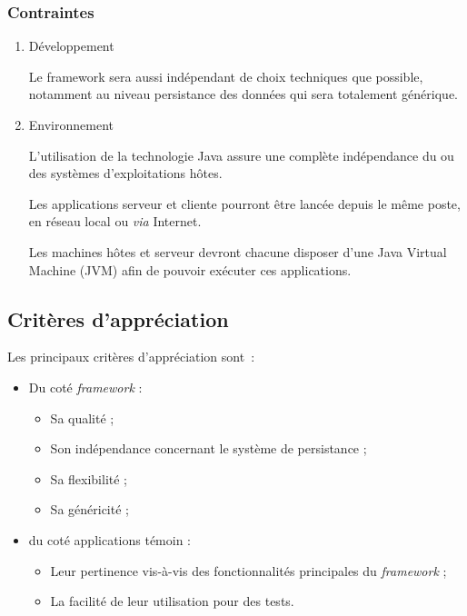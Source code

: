 \subsubsection{Contraintes}
\begin{enumerate}

	\item Développement

Le framework sera aussi indépendant de choix techniques que possible, notamment au niveau persistance des données qui sera totalement générique.

	\item Environnement

L'utilisation de la technologie Java assure une complète indépendance du ou des systèmes d'exploitations hôtes.

Les applications serveur et cliente pourront être lancée depuis le même poste, en réseau local ou \emph{via} Internet.

Les machines hôtes et serveur devront chacune disposer d'une Java Virtual Machine (JVM) afin de pouvoir exécuter ces applications.

\end{enumerate}

\subsection{Critères d’appréciation}

Les principaux critères d'appréciation sont~:

\begin{itemize}
	\item Du coté \emph{framework} :
	\begin{itemize} 
		\item Sa qualité ;
		\item Son indépendance concernant le système de persistance ;
		\item Sa flexibilité ;
		\item Sa généricité ;
	\end{itemize} 
	\item du coté applications témoin :
	\begin{itemize}
		\item Leur pertinence vis-à-vis des fonctionnalités principales du \emph{framework} ;
		\item La facilité de leur utilisation pour des tests.
	\end{itemize}
\end{itemize}


